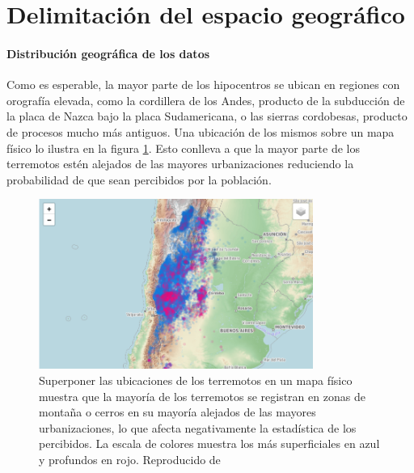 \documentclass[a4paper]{report}
\begin{document}
\section{Delimitación del espacio geográfico}\label{sec:geográfico}

\paragraph{Distribución geográfica de los datos}
Como es esperable, la mayor parte de los hipocentros se ubican en regiones con orografía elevada, como la cordillera de los Andes, producto de la subducción de la placa de Nazca bajo la placa Sudamericana, o las sierras cordobesas, producto de procesos mucho más antiguos. 
Una ubicación de los mismos sobre un mapa físico lo ilustra en la figura \ref{fig:mapa_sismos}.
Esto conlleva a que la mayor parte de los terremotos estén alejados de las mayores urbanizaciones reduciendo la probabilidad de que sean percibidos por la población.

\begin{figure}[!ht]
\centering
\includegraphics[width=0.8\textwidth]{mapa_sismos.png}
\caption{Superponer las ubicaciones de los terremotos en un mapa físico muestra que la mayoría de los terremotos se registran en zonas de montaña o cerros en su mayoría alejados de las mayores urbanizaciones, lo que afecta negativamente la estadística de los percibidos.
La escala de colores muestra los más superficiales en azul y profundos en rojo.
Reproducido de \cite{daniela_parada_ic-datasets-docencia_nodate}}
\label{fig:mapa_sismos}
\end{figure}
\end{document}
